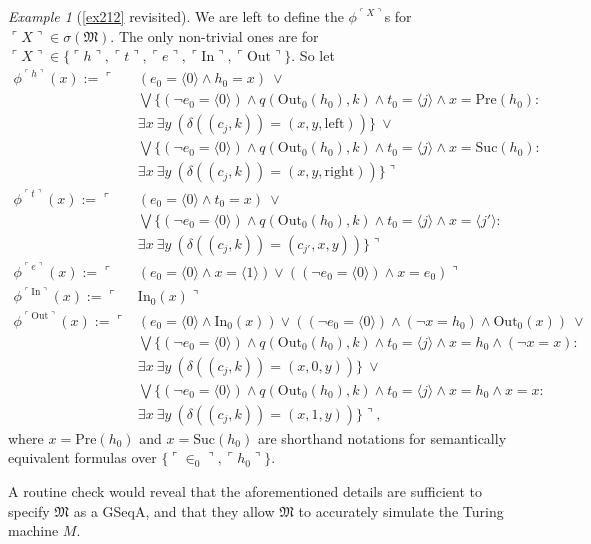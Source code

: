 \documentclass[12pt, twoside]{memoir}
\numberwithin{equation}{section}
\theoremstyle{definition}
\theoremstyle{remark}
\newtheorem{ex}[thm]{Example}
\theoremstyle{definition}
\theoremstyle{definition}
\theoremstyle{definition}
\theoremstyle{remark}
\begin{document}
\begin{ex}[\ref{ex212} revisited]
We are left to define the $\phi^{\ulcorner X \urcorner}$s for $\ulcorner X \urcorner \in \sigma(\mathfrak{M})$. The only non-trivial ones are for $\ulcorner X \urcorner \in \{\ulcorner h \urcorner, \ulcorner t \urcorner, \ulcorner e \urcorner, \ulcorner \mathrm{In} \urcorner, \ulcorner \mathrm{Out} \urcorner\}$. So let
\begin{align*}
    \phi^{\ulcorner h \urcorner}(x) := \ulcorner & (e_0 = \langle 0 \rangle \wedge h_0 = x) \ \vee \\
    & \bigvee \{(\neg e_0 = \langle 0 \rangle) \wedge q(\mathrm{Out}_0(h_0), k) \wedge t_0 \! = \! \langle j \rangle \wedge x = \mathrm{Pre}(h_0) : \\
    & \exists x \ \exists y \ (\delta((c_j, k)) = (x, y, \mathrm{left}))\} \ \vee \\ 
    & \bigvee \{(\neg e_0 = \langle 0 \rangle) \wedge q(\mathrm{Out}_0(h_0), k) \wedge t_0 \! = \! \langle j \rangle \wedge x = \mathrm{Suc}(h_0) : \\
    & \exists x \ \exists y \ (\delta((c_j, k)) = (x, y, \mathrm{right}))\} \urcorner \\
    \phi^{\ulcorner t \urcorner}(x) := \ulcorner & (e_0 = \langle 0 \rangle \wedge t_0 = x) \ \vee \\
    & \bigvee \{(\neg e_0 = \langle 0 \rangle) \wedge q(\mathrm{Out}_0(h_0), k) \wedge t_0 \! = \! \langle j \rangle \wedge x = \langle j' \rangle : \\
    & \exists x \ \exists y \ (\delta((c_j, k)) = (c_{j'}, x, y))\} \urcorner \\
    \phi^{\ulcorner e \urcorner}(x) := \ulcorner & (e_0 = \langle 0 \rangle \wedge x = \langle 1 \rangle) \vee ((\neg e_0 = \langle 0 \rangle) \wedge x = e_0) \urcorner \\
    \phi^{\ulcorner \mathrm{In} \urcorner}(x) := \ulcorner & \mathrm{In}_0(x) \urcorner \\
    \phi^{\ulcorner \mathrm{Out} \urcorner}(x) := \ulcorner & (e_0 = \langle 0 \rangle \wedge \mathrm{In}_0(x)) \vee ((\neg e_0 = \langle 0 \rangle) \wedge (\neg x = h_0) \wedge \mathrm{Out}_0(x)) \ \vee \\
    & \bigvee \{(\neg e_0 = \langle 0 \rangle) \wedge q(\mathrm{Out}_0(h_0), k) \wedge t_0 \! = \! \langle j \rangle \wedge x = h_0 \wedge (\neg x = x) : \\
    & \exists x \ \exists y \ (\delta((c_j, k)) = (x, 0, y))\} \ \vee \\
    & \bigvee \{(\neg e_0 = \langle 0 \rangle) \wedge q(\mathrm{Out}_0(h_0), k) \wedge t_0 \! = \! \langle j \rangle \wedge x = h_0 \wedge x = x : \\
    & \exists x \ \exists y \ (\delta((c_j, k)) = (x, 1, y))\} \urcorner \text{,}
\end{align*}
where $x = \mathrm{Pre}(h_0)$ and $x = \mathrm{Suc}(h_0)$ are shorthand notations for semantically equivalent formulas over $\{\ulcorner \in_0 \urcorner, \ulcorner h_0 \urcorner\}$. 

A routine check would reveal that the aforementioned details are sufficient to specify $\mathfrak{M}$ as a GSeqA, and that they allow $\mathfrak{M}$ to accurately simulate the Turing machine $M$. 
\end{ex}
\end{document}
